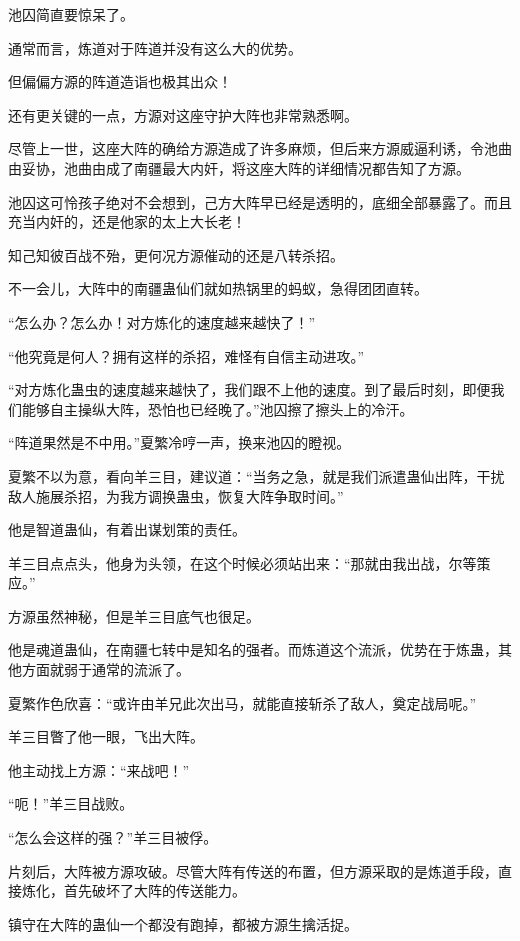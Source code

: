 \begin{this_body}
池囚简直要惊呆了。

通常而言，炼道对于阵道并没有这么大的优势。

但偏偏方源的阵道造诣也极其出众！

还有更关键的一点，方源对这座守护大阵也非常熟悉啊。

尽管上一世，这座大阵的确给方源造成了许多麻烦，但后来方源威逼利诱，令池曲由妥协，池曲由成了南疆最大内奸，将这座大阵的详细情况都告知了方源。

池囚这可怜孩子绝对不会想到，己方大阵早已经是透明的，底细全部暴露了。而且充当内奸的，还是他家的太上大长老！

知己知彼百战不殆，更何况方源催动的还是八转杀招。

不一会儿，大阵中的南疆蛊仙们就如热锅里的蚂蚁，急得团团直转。

“怎么办？怎么办！对方炼化的速度越来越快了！”

“他究竟是何人？拥有这样的杀招，难怪有自信主动进攻。”

“对方炼化蛊虫的速度越来越快了，我们跟不上他的速度。到了最后时刻，即便我们能够自主操纵大阵，恐怕也已经晚了。”池囚擦了擦头上的冷汗。

“阵道果然是不中用。”夏繁冷哼一声，换来池囚的瞪视。

夏繁不以为意，看向羊三目，建议道：“当务之急，就是我们派遣蛊仙出阵，干扰敌人施展杀招，为我方调换蛊虫，恢复大阵争取时间。”

他是智道蛊仙，有着出谋划策的责任。

羊三目点点头，他身为头领，在这个时候必须站出来：“那就由我出战，尔等策应。”

方源虽然神秘，但是羊三目底气也很足。

他是魂道蛊仙，在南疆七转中是知名的强者。而炼道这个流派，优势在于炼蛊，其他方面就弱于通常的流派了。

夏繁作色欣喜：“或许由羊兄此次出马，就能直接斩杀了敌人，奠定战局呢。”

羊三目瞥了他一眼，飞出大阵。

他主动找上方源：“来战吧！”

“呃！”羊三目战败。

“怎么会这样的强？”羊三目被俘。

片刻后，大阵被方源攻破。尽管大阵有传送的布置，但方源采取的是炼道手段，直接炼化，首先破坏了大阵的传送能力。

镇守在大阵的蛊仙一个都没有跑掉，都被方源生擒活捉。

\end{this_body}

